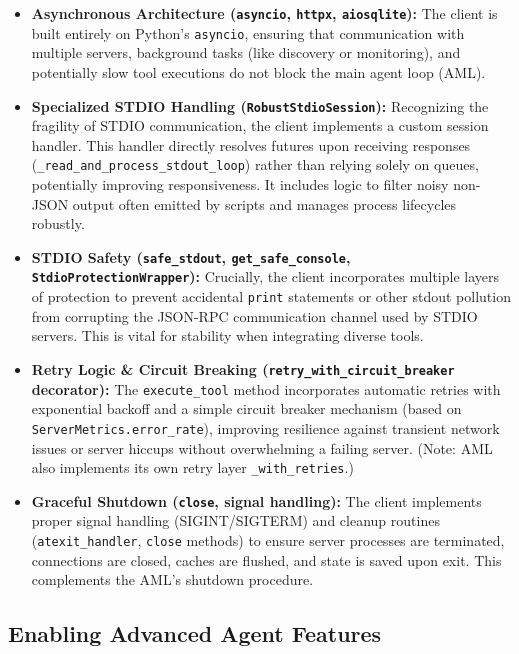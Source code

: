 \documentclass[12pt,a4paper]{article}
\newcommand{\code}[1]{\nolinkurl{#1}}
\begin{document}
\begin{itemize}
    \item \textbf{Asynchronous Architecture (\code{asyncio}, \code{httpx}, \code{aiosqlite}):} The client is built entirely on Python's \code{asyncio}, ensuring that communication with multiple servers, background tasks (like discovery or monitoring), and potentially slow tool executions do not block the main agent loop (AML).

    \item \textbf{Specialized STDIO Handling (\code{RobustStdioSession}):} Recognizing the fragility of STDIO communication, the client implements a custom session handler. This handler directly resolves futures upon receiving responses (\code{\_read\_and\_process\_stdout\_loop}) rather than relying solely on queues, potentially improving responsiveness. It includes logic to filter noisy non-JSON output often emitted by scripts and manages process lifecycles robustly.

    \item \textbf{STDIO Safety (\code{safe\_stdout}, \code{get\_safe\_console}, \code{StdioProtectionWrapper}):} Crucially, the client incorporates multiple layers of protection to prevent accidental \code{print} statements or other stdout pollution from corrupting the JSON-RPC communication channel used by STDIO servers. This is vital for stability when integrating diverse tools.

    \item \textbf{Retry Logic \& Circuit Breaking (\code{retry\_with\_circuit\_breaker} decorator):} The \code{execute\_tool} method incorporates automatic retries with exponential backoff and a simple circuit breaker mechanism (based on \code{ServerMetrics.error\_rate}), improving resilience against transient network issues or server hiccups without overwhelming a failing server. (Note: AML also implements its own retry layer \code{\_with\_retries}.)

    \item \textbf{Graceful Shutdown (\code{close}, signal handling):} The client implements proper signal handling (SIGINT/SIGTERM) and cleanup routines (\code{atexit\_handler}, \code{close} methods) to ensure server processes are terminated, connections are closed, caches are flushed, and state is saved upon exit. This complements the AML's shutdown procedure.
\end{itemize}

\subsection{Enabling Advanced Agent Features}
\end{document}
